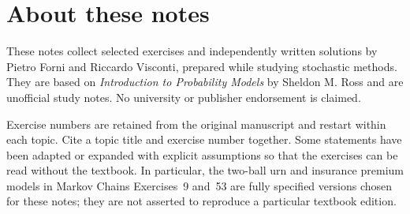 \documentclass[11pt,a4paper]{article}
\theoremstyle{exercisestyle}
\begin{document}
\hypersetup{pageanchor=false}

\hypersetup{pageanchor=true}
\section*{About these notes}
These notes collect selected exercises and independently written solutions
by Pietro Forni and Riccardo Visconti, prepared while studying stochastic
methods. They are based on \emph{Introduction to Probability Models}
by Sheldon M. Ross and are unofficial study notes. No university or
publisher endorsement is claimed.

Exercise numbers are retained from the original manuscript and restart
within each topic. Cite a topic title and exercise number together.
Some statements have been adapted or expanded with explicit assumptions
so that the exercises can be read without the textbook. In particular,
the two-ball urn and insurance premium models in Markov Chains
Exercises~9 and~53 are fully specified versions chosen for these notes;
they are not asserted to reproduce a particular textbook edition.
\end{document}
